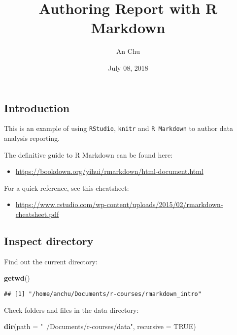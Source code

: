 \documentclass[]{article}
\title{Authoring Report with R Markdown}
\author{An Chu}
\date{July 08, 2018}
\newenvironment{Shaded}{\begin{snugshade}}{\end{snugshade}}
\newcommand{\KeywordTok}[1]{\textcolor[rgb]{0.13,0.29,0.53}{\textbf{#1}}}
\newcommand{\DataTypeTok}[1]{\textcolor[rgb]{0.13,0.29,0.53}{#1}}
\newcommand{\StringTok}[1]{\textcolor[rgb]{0.31,0.60,0.02}{#1}}
\newcommand{\OtherTok}[1]{\textcolor[rgb]{0.56,0.35,0.01}{#1}}
\newcommand{\NormalTok}[1]{#1}
\providecommand{\tightlist}{%
  \setlength{\itemsep}{0pt}\setlength{\parskip}{0pt}}
\begin{document}
\maketitle

\subsection{Introduction}\label{introduction}

This is an example of using \texttt{RStudio}, \texttt{knitr} and
\texttt{R\ Markdown} to author data analysis reporting.

The definitive guide to R Markdown can be found here:

\begin{itemize}
\tightlist
\item
  \url{https://bookdown.org/yihui/rmarkdown/html-document.html}
\end{itemize}

For a quick reference, see this cheatsheet:

\begin{itemize}
\tightlist
\item
  \url{https://www.rstudio.com/wp-content/uploads/2015/02/rmarkdown-cheatsheet.pdf}
\end{itemize}

\subsection{Inspect directory}\label{inspect-directory}

Find out the current directory:

\begin{Shaded}
\begin{Highlighting}[]
\KeywordTok{getwd}\NormalTok{()}
\end{Highlighting}
\end{Shaded}

\begin{verbatim}
## [1] "/home/anchu/Documents/r-courses/rmarkdown_intro"
\end{verbatim}

Check folders and files in the data directory:

\begin{Shaded}
\begin{Highlighting}[]
\KeywordTok{dir}\NormalTok{(}\DataTypeTok{path =} \StringTok{"~/Documents/r-courses/data"}\NormalTok{, }\DataTypeTok{recursive =} \OtherTok{TRUE}\NormalTok{)}
\end{Highlighting}
\end{Shaded}
\end{document}
